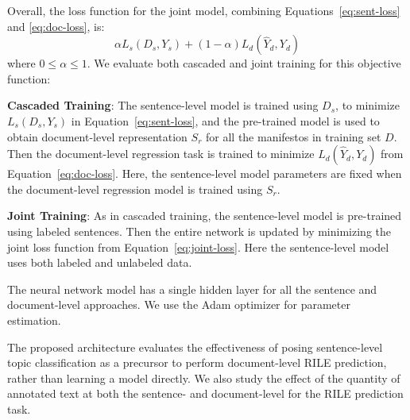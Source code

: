 \documentclass[11pt,a4paper]{article}
\newcommand{\eqnref}[2][]{Equation#1~\ref{#2}\xspace}
\begin{document}
Overall, the loss function for the joint model, combining \eqnref[s]{eq:sent-loss} and \ref{eq:doc-loss}, is:
\begin{equation}
 \alpha L_{s}(D_{s},Y_{s}) + (1-\alpha) L_{d}(\hat{Y}_{d}, Y_{d})
 \label{eq:joint-loss}
\end{equation}
where $0 \le \alpha \le 1$.
We evaluate both cascaded and joint training for this objective function:
\begin{description}
\item{\textbf{Cascaded Training}:} The sentence-level model is trained using $D_{s}$, to minimize $L_{s}(D_{s},Y_{s})$ in \eqnref{eq:sent-loss}, and the pre-trained model is used to obtain document-level representation $S_{r}$ for all the manifestos in training set $D$. Then the document-level regression task is trained to minimize $L_{d}(\hat{Y}_{d}, Y_{d})$ from \eqnref{eq:doc-loss}. Here, the sentence-level model parameters are fixed when the document-level regression model is trained using $S_{r}$.

\item{\textbf{Joint Training}:} As in cascaded training, the sentence-level model is pre-trained using labeled sentences. Then the entire network is updated by minimizing the joint loss function from \eqnref{eq:joint-loss}. Here the sentence-level model uses both labeled and unlabeled data.
\end{description}

The neural network model has a single hidden layer for all the sentence and document-level approaches.  We use the Adam optimizer \cite{DBLP:journals/corr/KingmaB14} for parameter estimation. 

The proposed architecture evaluates the effectiveness of posing sentence-level topic classification as a precursor to perform document-level RILE prediction, rather than learning a model directly.  We also study the effect of the quantity of annotated text at both the sentence- and document-level for the RILE prediction task. 


\end{document}
